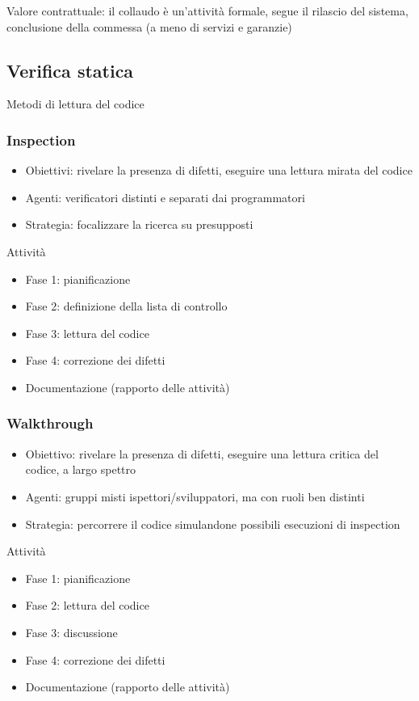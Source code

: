 Valore contrattuale: il collaudo è un'attività formale, segue il rilascio del sistema, conclusione della commessa (a meno di servizi e garanzie)

\subsection{Verifica statica}
Metodi di lettura del codice

\subsubsection{Inspection}
\begin{itemize}
\item Obiettivi: rivelare la presenza di difetti, eseguire una lettura mirata del codice
\item Agenti: verificatori distinti e separati dai programmatori
\item Strategia: focalizzare la ricerca su presupposti
\end{itemize}
Attività
\begin{itemize}
\item Fase 1: pianificazione
\item Fase 2: definizione della lista di controllo
\item Fase 3: lettura del codice
\item Fase 4: correzione dei difetti
\item Documentazione (rapporto delle attività)
\end{itemize}

\subsubsection{Walkthrough}
\begin{itemize}
\item Obiettivo: rivelare la presenza di difetti, eseguire una lettura critica del codice, a largo spettro
\item Agenti: gruppi misti ispettori/sviluppatori, ma con ruoli ben distinti
\item Strategia: percorrere il codice simulandone possibili esecuzioni
di inspection
\end{itemize}

Attività
\begin{itemize}
\item Fase 1: pianificazione
\item Fase 2: lettura del codice
\item Fase 3: discussione
\item Fase 4: correzione dei difetti
\item Documentazione (rapporto delle attività)
\end{itemize}

